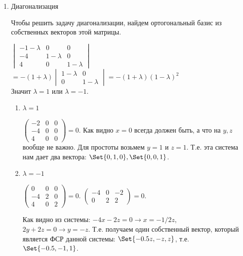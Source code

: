 \begin{enumerate}
    \item Диагонализация

    Чтобы решить задачу диагонализации, найдем ортогональный базис из собственных векторов этой матрицы.

    $
    \begin{vmatrix}
        -1 - \lambda & 0           & 0           \\
        -4           & 1 - \lambda & 0           \\
        4            & 0           & 1 - \lambda
    \end{vmatrix}
    $
    $ = -(1+\lambda)
    \begin{vmatrix}
        1-\lambda & 0         \\
        0         & 1-\lambda
    \end{vmatrix}
    = -(1+\lambda)(1-\lambda)^2
    $\\

    Значит $\lambda = 1$ или $\lambda = -1$.

    \begin{enumerate}
        \item $\lambda = 1$

        $
        \begin{pmatrix}
            -2 & 0 & 0 \\
            -4 & 0 & 0 \\
            4  & 0 & 0
        \end{pmatrix} = 0.
        $
        Как видно $x = 0$ всегда должен быть, а что на $y,z$ вообще не важно.
        Для простоты возьмем $y = 1$ и $z = 1$. Т.е. эта система нам дает два вектора: $\Set{0,1,0}, \Set{0,0,1}$.

        \item $\lambda = -1$

        $
        \begin{pmatrix}
            0  & 0 & 0 \\
            -4 & 2 & 0 \\
            4  & 0 & 2
        \end{pmatrix} = 0.
        $
        $
        \begin{pmatrix}
            -4 & 0 & -2 \\
            0  & 2 & 2
        \end{pmatrix} = 0.
        $

        Как видно из системы: $-4x -2z = 0 \rightarrow x = -1/2z$,
        $2y+2z=0 \rightarrow y=-z$. Т.е. получаем один собственный вектор, который является ФСР данной системы: $\Set{-0.5z,-z,z}$, т.е. $\Set{-0.5,-1,1}$.


\end{enumerate}
\end{enumerate}
